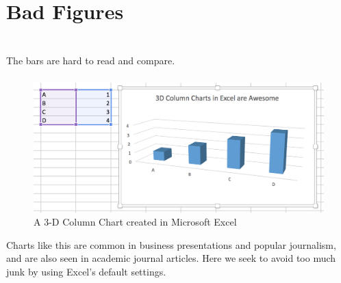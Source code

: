 \documentclass[11pt]{beamer}
\begin{document}
\section{Bad Figures}
\begin{frame}
	
	\frametitle{\bfseries}
	\vspace{-1em}
	\\
		The bars are hard to read and compare.
\end{frame}

\begin{frame}
	
	\frametitle{\bfseries}
	\begin{figure}
		\vspace{-1em}
		\includegraphics[width=0.9\linewidth]{Figure/excel-3d-column-chart-values}
		\\
		\tiny{A 3-D Column Chart created in Microsoft Excel}
	\end{figure}
	\begin{itemize}
		\vspace{-1em}
		\footnotesize{
			\item Charts like this are common in business presentations and popular journalism, and are also seen in academic journal articles. Here we seek to avoid too much junk by using Excel’s default settings.
			 
		 }
	\end{itemize}
\end{frame}
\end{document}
